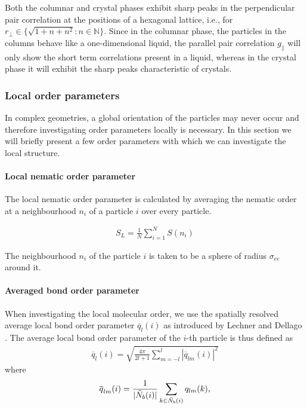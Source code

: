 Both the columnar and crystal phases exhibit sharp peaks in the perpendicular pair correlation at the positions of a hexagonal lattice, i.e., for $r_{\perp} \in \{ \sqrt{1+n+n^2}: n \in \mathbb{N}\}$. Since in the columnar phase, the particles in the columns behave like a one-dimensional liquid, the parallel pair correlation $g_\parallel$ will only show the short term correlations present in a liquid, whereas in the crystal phase it will exhibit the sharp peaks characteristic of crystals.

\subsubsection{Local order parameters}
In complex geometries, a global orientation of the particles may never occur and therefore investigating order parameters locally is necessary. In this section we will briefly present a few order parameters with which we can investigate the local structure.
\paragraph {Local nematic order parameter}

The local nematic order parameter is calculated by averaging the nematic order at a neighbourhood $n_i$ of a particle $i$ over every particle.

\begin{align}
    S_L = \frac{1}{N}\displaystyle\sum_{i=1}^N  S(n_i)
\end{align}

The neighbourhood $n_i$ of the particle $i$ is taken to be a sphere of radius $\sigma_{ee}$ around it.

\paragraph{Averaged bond order parameter}

When investigating the local molecular order, we use the spatially resolved average local bond order parameter $\overline{q}_l(i)$ as introduced by Lechner and Dellago \cite{lechner2008accurate}. The average local bond order parameter of the $i$-th particle is thus defined as
\begin{align}
\overline{q}_l(i) = \sqrt{\frac{4 \pi}{2l+1}\displaystyle\sum_{m=-l}^{l} \left|\overline{q}_{lm}(i)\right|^2}
\end{align}
where
\begin{align}
\overline{q}_{lm}(i) = \frac{1}{|\Tilde{N}_b(i)|} \displaystyle\sum_{k\in \Tilde{N}_b(i) } q_{lm}(k),
\end{align}

